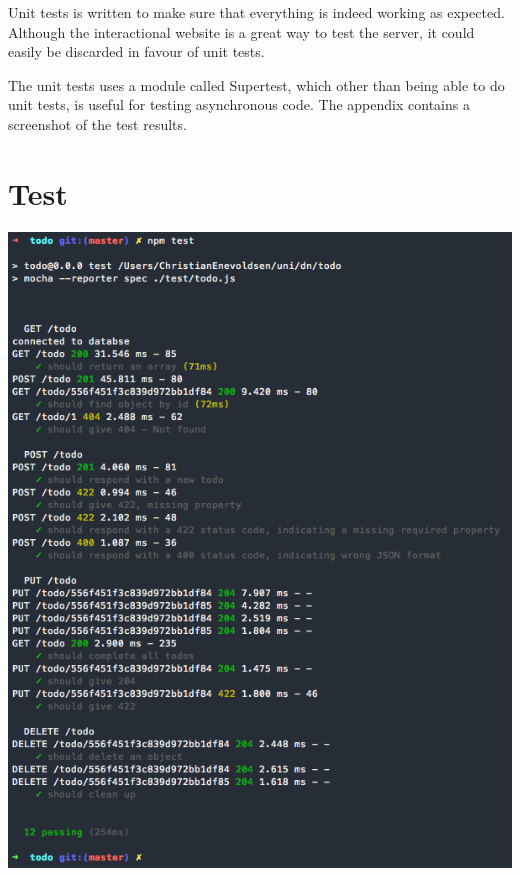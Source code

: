 \documentclass[a4paper,danish]{dnacm} %
\begin{document}
Unit tests is written to make sure that everything is indeed working as expected. Although the interactional website is a great way to test the server, it could easily be discarded in favour of unit tests. 

The unit tests uses a module called Supertest, which other than being able to do unit tests, is useful for testing asynchronous code. The appendix contains a screenshot of the test results. 

\newpage

\appendix

\section{Test}

\includegraphics[scale=0.4]{tests.png}
\end{document}
